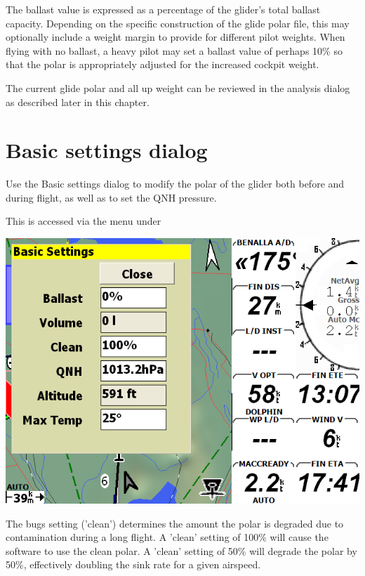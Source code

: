 \documentclass[a4paper,12pt]{refrep}
\begin{document}
The ballast value is expressed as a percentage of the glider's total
ballast capacity.  Depending on the specific construction of the glide
polar file, this may optionally include a weight margin to provide for
different pilot weights.  When flying with no ballast, a heavy pilot
may set a ballast value of perhaps 10\% so that the polar is
appropriately adjusted for the increased cockpit weight.


The current glide polar and all up weight can be reviewed in the
analysis dialog as described later in this chapter.

\section{Basic settings dialog}\label{sec:basic-sett-dial}
Use the Basic settings dialog to modify the polar of the glider both
before and during flight, as well as to set the QNH pressure.  

This is accessed via the menu under 
\begin{quote}
\blink{}
\end{quote}

\begin{center}
\includegraphics[angle=0,width=\linewidth,keepaspectratio='true']{figures/dialog-basicsettings.png}
\end{center}

The bugs setting ('clean') determines the amount the polar is degraded
due to contamination during a long flight.  A 'clean' setting of 100\%
will cause the software to use the clean polar. A 'clean' setting of
50\% will degrade the polar by 50\%, effectively doubling the sink
rate for a given airspeed.
\end{document}
